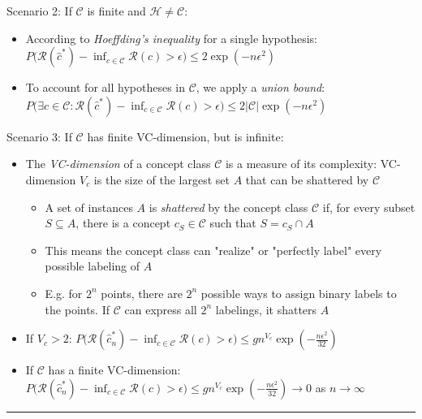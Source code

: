 Scenario 2: If $\mathcal{C}$ is finite and $\mathcal{H} \neq \mathcal{C}$:
\begin{itemize}
    \item According to \emph{Hoeffding's inequality} for a single hypothesis:
    $
    P\big(\mathcal{R}(\hat{c}^*) - \inf_{c \in \mathcal{C}} \mathcal{R}(c) > \epsilon\big) \leq 2 \exp(-n \epsilon^2)
    $
    \item To account for all hypotheses in $\mathcal{C}$, we apply a \emph{union bound}:
    $
    P\big(\exists c \in \mathcal{C}: \mathcal{R}(\hat{c}^*) - \inf_{c \in \mathcal{C}} \mathcal{R}(c) > \epsilon\big) \leq 2 |\mathcal{C}| \exp(-n \epsilon^2)
    $
\end{itemize}
Scenario 3: If $\mathcal{C}$ has finite VC-dimension, but is infinite:
\begin{itemize}
    \item The \emph{VC-dimension} of a concept class $\mathcal{C}$ is a measure of its complexity: VC-dimension $V_c$ is the size of the largest set $A$ that can be shattered by $\mathcal{C}$
    \begin{itemize}
        \item A set of instances $A$ is \emph{shattered} by the concept class $\mathcal{C}$ if, for every subset $S \subseteq A$, there is a concept $c_S \in \mathcal{C}$ such that $S = c_S \cap A$
        \item This means the concept class can "realize" or "perfectly label" every possible labeling of $A$
        \item E.g. for $2^n$ points, there are $2^n$ possible ways to assign binary labels to the points. If $\mathcal{C}$ can express all $2^n$ labelings, it shatters $A$
    \end{itemize}
    \item If $V_c > 2$:
    $
    P\big(\mathcal{R}(\hat{c}^*_n) - \inf_{c \in \mathcal{C}} \mathcal{R}(c) > \epsilon\big) \leq g  n^{V_c} \exp\left(-\frac{n \epsilon^2}{32}\right)
    $
    \item If $\mathcal{C}$ has a finite VC-dimension:
    $
    P\big(\mathcal{R}(\hat{c}^*_n) - \inf_{c \in \mathcal{C}} \mathcal{R}(c) > \epsilon\big) \leq g n^{V_c} \exp\left(-\frac{n \epsilon^2}{32}\right) \to 0$ as $n \to \infty$
\end{itemize}

{\color{black}\hrule height 0.001mm}


